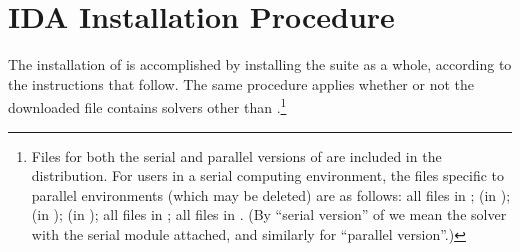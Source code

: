 \chapter{IDA Installation Procedure}\label{s:install}

The installation of {\ida} is accomplished by installing the
{\sundials} suite as a whole, according to the instructions that
follow.   The same procedure applies whether or not the downloaded
file contains solvers other than {\ida}.\footnote{Files for both the
serial and parallel versions of {\ida} are included in the distribution.
For users in a serial computing environment, the files specific to parallel
environments (which may be deleted) are as follows:
all files in ;
 (in );
 (in ); 
 (in );
all files in ;
all files in .
(By ``serial version'' of {\ida} we mean the {\ida} solver with the
serial {\nvector} module attached, and similarly for ``parallel version''.)}

